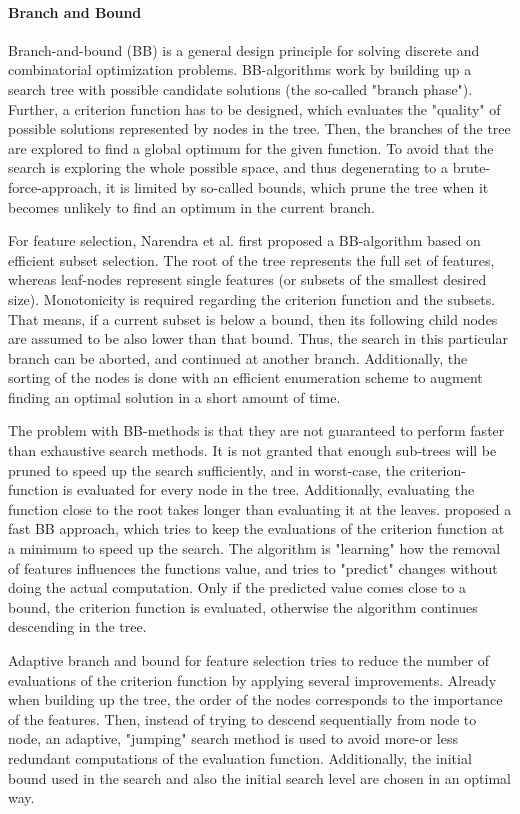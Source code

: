 \paragraph{Branch and Bound}
\label{par:methods.flat.wrapper.branch_and_bound}


Branch-and-bound (BB) is a general design principle for solving discrete and combinatorial optimization problems. BB-algorithms work by building up a search tree with possible candidate solutions (the so-called "branch phase"). Further, a criterion function has to be designed, which evaluates the "quality" of possible solutions represented by nodes in the tree. Then, the branches of the tree are explored to find a global optimum for the given function. To avoid that the search is exploring the whole possible space, and thus degenerating to a brute-force-approach, it is limited by so-called bounds, which prune the tree when it becomes unlikely to find an optimum in the current branch. 

For feature selection, Narendra et al. \cite{Narendra:77} first proposed a BB-algorithm based on efficient subset selection. The root of the tree represents the full set of features, whereas leaf-nodes represent single features (or subsets of the smallest desired size). Monotonicity is required regarding the criterion function and the subsets. That means, if a current subset is below a bound, then its following child nodes are assumed to be also lower than that bound. Thus, the search in this particular branch can be aborted, and continued at another branch. Additionally, the sorting of the nodes is done with an efficient enumeration scheme to augment finding an optimal solution in a short amount of time.

The problem with BB-methods is that they are not guaranteed to perform faster than exhaustive search methods. It is not granted that enough sub-trees will be pruned to speed up the search sufficiently, and in worst-case, the criterion-function is evaluated for every node in the tree. Additionally, evaluating the function close to the root takes longer than evaluating it at the leaves. \cite{Somol:04} proposed a fast BB approach, which tries to keep the evaluations of the criterion function at a minimum to speed up the search. The algorithm is "learning" how the removal of features influences the functions value, and tries to "predict" changes without doing the actual computation. Only if the predicted value comes close to a bound, the criterion function is evaluated, otherwise the algorithm continues descending in the tree.

Adaptive branch and bound for feature selection \cite{Nakariyakul:07} tries to reduce the number of evaluations of the criterion function by applying several improvements. Already when building up the tree, the order of the nodes corresponds to the importance of the features. Then, instead of trying to descend sequentially from node to node, an adaptive, "jumping" search method is used to avoid more-or less redundant computations of the evaluation function. Additionally, the initial bound used in the search and also the initial search level are chosen in an optimal way.
